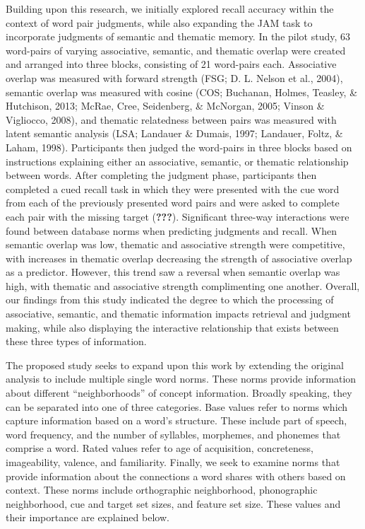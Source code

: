 \documentclass[english,man]{apa6}
\theoremstyle{definition}
\theoremstyle{definition}
\theoremstyle{definition}
\theoremstyle{remark}
\begin{document}
Building upon this research, we initially explored recall accuracy
within the context of word pair judgments, while also expanding the JAM
task to incorporate judgments of semantic and thematic memory. In the
pilot study, 63 word-pairs of varying associative, semantic, and
thematic overlap were created and arranged into three blocks, consisting
of 21 word-pairs each. Associative overlap was measured with forward
strength (FSG; D. L. Nelson et al., 2004), semantic overlap was measured
with cosine (COS; Buchanan, Holmes, Teasley, \& Hutchison, 2013; McRae,
Cree, Seidenberg, \& McNorgan, 2005; Vinson \& Vigliocco, 2008), and
thematic relatedness between pairs was measured with latent semantic
analysis (LSA; Landauer \& Dumais, 1997; Landauer, Foltz, \& Laham,
1998). Participants then judged the word-pairs in three blocks based on
instructions explaining either an associative, semantic, or thematic
relationship between words. After completing the judgment phase,
participants then completed a cued recall task in which they were
presented with the cue word from each of the previously presented word
pairs and were asked to complete each pair with the missing target
({\textbf{???}}). Significant three-way interactions were found between
database norms when predicting judgments and recall. When semantic
overlap was low, thematic and associative strength were competitive,
with increases in thematic overlap decreasing the strength of
associative overlap as a predictor. However, this trend saw a reversal
when semantic overlap was high, with thematic and associative strength
complimenting one another. Overall, our findings from this study
indicated the degree to which the processing of associative, semantic,
and thematic information impacts retrieval and judgment making, while
also displaying the interactive relationship that exists between these
three types of information.

The proposed study seeks to expand upon this work by extending the
original analysis to include multiple single word norms. These norms
provide information about different \enquote{neighborhoods} of concept
information. Broadly speaking, they can be separated into one of three
categories. Base values refer to norms which capture information based
on a word's structure. These include part of speech, word frequency, and
the number of syllables, morphemes, and phonemes that comprise a word.
Rated values refer to age of acquisition, concreteness, imageability,
valence, and familiarity. Finally, we seek to examine norms that provide
information about the connections a word shares with others based on
context. These norms include orthographic neighborhood, phonographic
neighborhood, cue and target set sizes, and feature set size. These
values and their importance are explained below.
\end{document}
